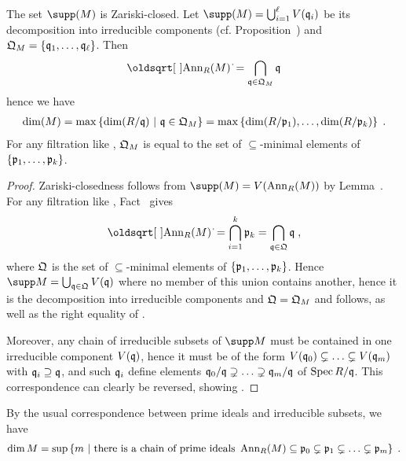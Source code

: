 \documentclass[a4paper,parskip=half,numbers=enddot, DIV=12, headheight=30pt]{scrreprt}
\begin{document}
\begin{fact}
    The set $\supp(M)$ is Zariski-closed. Let $\supp(M) = \bigcup_{i=1}^\ell V(\qq_i)$ be its decomposition into irreducible components (cf. Proposition~) and $\mathfrak{Q}_M= \left\{\mathfrak{q}_1,\ldots,\mathfrak{q}_\ell\right\}$. Then 
    \begin{align}
        \sqrt{\Ann_R(M)} = \bigcap_{\qq\in \QQ_M} \qq  \lbl{eq:sqrtAnnCap}
    \end{align}
    hence we have
    \begin{align}
        \dim (M) = \max \left\{\dim(R/\qq)\st \qq\in \QQ_M\right\}=\max\left\{\dim(R/\pp_1),\ldots,\dim(R/\pp_k)\right\}\;.\lbl{eq:dimSuppM}
    \end{align}
    For any filtration like , $\mathfrak{Q}_M$ is equal to the set of $\subseteq$-minimal elements of $\left\{\mathfrak{p}_1,\ldots,\mathfrak{p}_k\right\}$.
\end{fact}
\begin{proof}
    Zariski-closedness follows from $\supp(M) = V(\Ann_R(M))$ by Lemma~. For any filtration like , Fact~ gives 
    \begin{align*}
    	\sqrt{\Ann_R(M)}  =\bigcap_{i=1}^k \pp_k = \bigcap_{\qq\in\QQ} \qq\;,
    \end{align*}
    where $\mathfrak{Q}$ is the set of $\subseteq$-minimal elements of $\left\{\mathfrak{p}_1,\ldots,\mathfrak{p}_k\right\}$. Hence $\supp M=\bigcup_{\qq\in \QQ} V(\qq)$ where no member of this union contains another, hence it is the decomposition into irreducible components and $\mathfrak{Q}= \mathfrak{Q}_M$ and  follows, as well as the right equality of . 
    
    Moreover, any chain of irreducible subsets of $\supp M$ must be contained in one irreducible component $V(\mathfrak{q})$, hence it must be of the form $V(\mathfrak{q}_0)\subsetneq \ldots\subsetneq V(\mathfrak{q}_m)$ with $\mathfrak{q}_i\supseteq \mathfrak{q}$, and such $\mathfrak{q}_i$ define elements $\mathfrak{q}_0/\mathfrak{q}\supsetneq\ldots\supsetneq\mathfrak{q}_m/\mathfrak{q}$ of $\operatorname{Spec} R/\mathfrak{q}$. This correspondence can clearly be reversed, showing .
\end{proof}
\begin{rem*}
    By the usual correspondence between prime ideals and irreducible subsets, we have
    \begin{align}
        \dim M = \sup\left\{m\st \text{there is a chain of prime ideals } \Ann_R(M) \subseteq \pp_0\subsetneq \pp_1\subsetneq \ldots \subsetneq \pp_m\right\}\;. \lbl{eq:dimChainAnn}
    \end{align}
\end{rem*}
\end{document}
